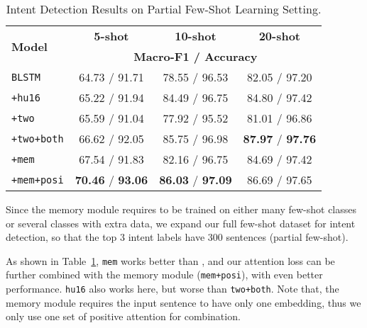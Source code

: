 \begin{table}
\setlength{\tabcolsep}{0.23em}
\centering
\small{
\begin{tabular}{|l|c|c|c|}

\hline
\multirow{2}{*}{\textbf{Model}}  & \multicolumn{1}{|c|}{\textbf{5-shot}} & \multicolumn{1}{|c|}{\textbf{10-shot}} & \multicolumn{1}{|c|}{\textbf{20-shot}}  \\
\cline{2-4}
 & \multicolumn{3}{|c|}{\textbf{Macro-F1 / Accuracy}}   \\
\hline
\rowcolor{Gray} \texttt{BLSTM} & 64.73 / 91.71 & 78.55 / 96.53 & 82.05 / 97.20 \\
\hline
\texttt{+hu16} & 65.22 / 91.94 & 84.49 / 96.75 & 84.80 / 97.42 \\
\hline
\rowcolor{Gray} \texttt{+two} & 65.59 / 91.04 & 77.92 / 95.52 & 81.01 / 96.86 \\
\hline
\texttt{+two+both} & 66.62 / 92.05 & 85.75 / 96.98 & \textbf{87.97} / \textbf{97.76} \\
\hline
\rowcolor{Gray} \texttt{+mem} & 67.54 / 91.83 & 82.16 / 96.75 & 84.69 / 97.42 \\
\hline
\texttt{+mem+posi} & \textbf{70.46} / \textbf{93.06} & \textbf{86.03} / \textbf{97.09} & 86.69 / 97.65 \\
\hline

\end{tabular}
} \caption{Intent Detection Results on Partial Few-Shot Learning Setting.} \label{tab_intent_few_fill} \vspace{-1em}
\end{table}

Since the memory module requires to be trained on either many few-shot classes or several classes with extra data,
we expand our full few-shot dataset for intent detection, so that the top 3 intent labels have 300 sentences (partial few-shot).

As shown in Table~\ref{tab_intent_few_fill}, \texttt{mem} works better than \BLSTM, and our attention loss can be further combined with the memory module (\texttt{mem+posi}), with even better performance. %
\texttt{hu16} also works here, but  worse than \texttt{two+both}.
Note that, the memory module requires the input sentence to have only one embedding, thus we only use one set of positive attention for combination.

